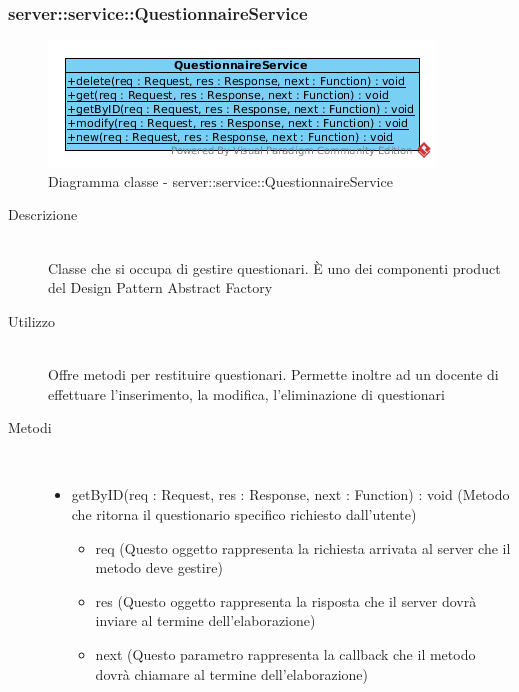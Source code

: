 \subsubsection[QuestionnaireService]{server::service::QuestionnaireService}
\begin{center}
			\begin{figure}[H]
				\centering \includegraphics[scale=4, max width=\textwidth, max height=\myheight]{../img/diagrammiClassi/server/service/QuestionnaireService.png}
				\caption{Diagramma classe - server::service::QuestionnaireService}
			\end{figure}
		\end{center}\begin{description}
\item[Descrizione] \hfill \\
 Classe che si occupa di gestire questionari. È uno dei componenti product del Design Pattern Abstract Factory
\item[Utilizzo] \hfill \\
 Offre metodi per restituire questionari. Permette inoltre ad un docente di effettuare l'inserimento, la modifica, l'eliminazione di questionari
\item[Metodi] \hfill \\
 \vspace{-7mm}
\begin{itemize}
\item getByID(req : Request, res : Response, next : Function) : void (Metodo che ritorna il questionario specifico richiesto dall'utente)\begin{itemize}
\item req (Questo oggetto rappresenta la richiesta arrivata al server che il metodo deve gestire)
\item res (Questo oggetto rappresenta la risposta che il server dovrà inviare al termine dell'elaborazione)
\item next (Questo parametro rappresenta la callback che il metodo dovrà chiamare al termine dell’elaborazione)
\end{itemize}


\end{itemize}
\end{description}
